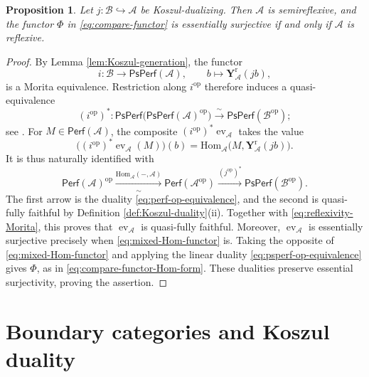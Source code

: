 \documentclass[11pt,letterpaper,reqno]{amsart}
\theoremstyle{plain}
\newtheorem{proposition}[proposition]{Proposition}
\theoremstyle{definition}
\theoremstyle{plain}
\theoremstyle{definition}
\numberwithin{equation}{section}
\begin{document}
\begin{proposition}\label{prop:reflexivity}
Let $j:\mathscr B\hookrightarrow\mathscr A$ be Koszul-dualizing.
Then $\mathscr A$ is semireflexive, and the functor $\Phi$ in \eqref{eq:compare-functor} is essentially surjective if and only if $\mathscr A$ is reflexive.
\end{proposition}
\begin{proof}
By Lemma \ref{lem:Koszul-generation}, the functor
\[
i:\mathscr B\longrightarrow\mathsf{PsPerf}(\mathscr A),
\qquad b\longmapsto\mathbf Y_{\mathscr A}^{\mathrm r}(jb),
\]
is a Morita equivalence.
Restriction along $i^{\mathrm{op}}$ therefore induces a quasi-equivalence
\begin{equation}\label{eq:reflexivity-Morita}
(i^{\mathrm{op}})^*:
\mathsf{PsPerf}\bigl(\mathsf{PsPerf}(\mathscr A)^{\mathrm{op}}\bigr)
\xrightarrow{\;\sim\;}\mathsf{PsPerf}(\mathscr B^{\mathrm{op}});
\end{equation}
see \cite[Proposition 3.5]{Goodbody2026}.
For $M\in\mathsf{Perf}(\mathscr A)$, the composite $(i^{\mathrm{op}})^*\operatorname{ev}_{\mathscr A}$ takes the value
\[
\bigl((i^{\mathrm{op}})^*\operatorname{ev}_{\mathscr A}(M)\bigr)(b)
=\mathrm{Hom}_{\mathscr A}\bigl(M,\mathbf Y_{\mathscr A}^{\mathrm r}(jb)\bigr).
\]
It is thus naturally identified with
\begin{equation}\label{eq:mixed-Hom-functor}
\mathsf{Perf}(\mathscr A)^{\mathrm{op}}
\xrightarrow[\sim]{\mathrm{Hom}_{\mathscr A}(-,\mathscr A)}
\mathsf{Perf}(\mathscr A^{\mathrm{op}})
\xrightarrow{(j^{\mathrm{op}})^*}
\mathsf{PsPerf}(\mathscr B^{\mathrm{op}}).
\end{equation}
The first arrow is the duality \eqref{eq:perf-op-equivalence}, and the second is quasi-fully faithful by Definition \ref{def:Koszul-duality}(ii).
Together with \eqref{eq:reflexivity-Morita}, this proves that $\operatorname{ev}_{\mathscr A}$ is quasi-fully faithful.
Moreover, $\operatorname{ev}_{\mathscr A}$ is essentially surjective precisely when \eqref{eq:mixed-Hom-functor} is.
Taking the opposite of \eqref{eq:mixed-Hom-functor} and applying the linear duality \eqref{eq:psperf-op-equivalence} gives $\Phi$, as in \eqref{eq:compare-functor-Hom-form}.
These dualities preserve essential surjectivity, proving the assertion.
\end{proof}




\section{Boundary categories and Koszul duality}\label{sec:infinity-singularity}
\end{document}
